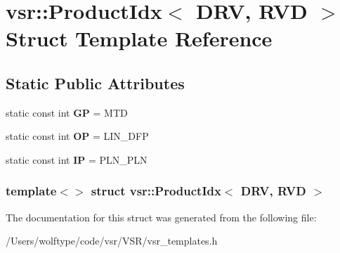 \hypertarget{structvsr_1_1_product_idx_3_01_d_r_v_00_01_r_v_d_01_4}{\section{vsr\-:\-:Product\-Idx$<$ D\-R\-V, R\-V\-D $>$ Struct Template Reference}
\label{structvsr_1_1_product_idx_3_01_d_r_v_00_01_r_v_d_01_4}
}
\subsection*{Static Public Attributes}
\begin{DoxyCompactItemize}
\item 
\hypertarget{structvsr_1_1_product_idx_3_01_d_r_v_00_01_r_v_d_01_4_a1f35245f9f7f9dbd7dc7bae51204ff8f}{static const int {\bfseries G\-P} = M\-T\-D}\label{structvsr_1_1_product_idx_3_01_d_r_v_00_01_r_v_d_01_4_a1f35245f9f7f9dbd7dc7bae51204ff8f}

\item 
\hypertarget{structvsr_1_1_product_idx_3_01_d_r_v_00_01_r_v_d_01_4_a32ddc6349ca738a2fe6b566bd98a9863}{static const int {\bfseries O\-P} = L\-I\-N\-\_\-\-D\-F\-P}\label{structvsr_1_1_product_idx_3_01_d_r_v_00_01_r_v_d_01_4_a32ddc6349ca738a2fe6b566bd98a9863}

\item 
\hypertarget{structvsr_1_1_product_idx_3_01_d_r_v_00_01_r_v_d_01_4_a9b3e27d15f24ea79d51f4db1743e719f}{static const int {\bfseries I\-P} = P\-L\-N\-\_\-\-P\-L\-N}\label{structvsr_1_1_product_idx_3_01_d_r_v_00_01_r_v_d_01_4_a9b3e27d15f24ea79d51f4db1743e719f}

\end{DoxyCompactItemize}
\subsubsection*{template$<$$>$ struct vsr\-::\-Product\-Idx$<$ D\-R\-V, R\-V\-D $>$}



The documentation for this struct was generated from the following file\-:\begin{DoxyCompactItemize}
\item 
/\-Users/wolftype/code/vsr/\-V\-S\-R/vsr\-\_\-templates.\-h\end{DoxyCompactItemize}
